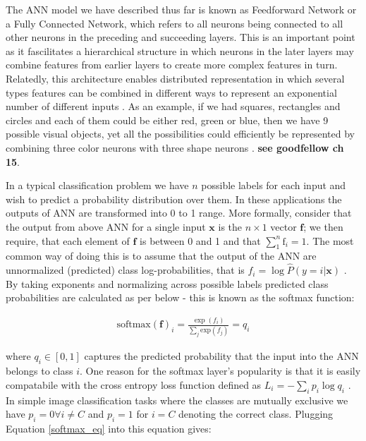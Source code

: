 \documentclass{report}
\begin{document}
The ANN model we have described thus far is known as Feedforward Network or a Fully Connected Network, which refers to all neurons being connected to all other neurons in the preceding and succeeding layers. This is an important point as it fascilitates a hierarchical structure in which neurons in the later layers may combine features from earlier layers to create more complex features in turn. Relatedly, this architecture enables distributed representation in which several types features can be combined in different ways to represent an exponential number of different inputs \cite{Hinton1985}. As an example, if we had squares, rectangles and circles and each of them could be either red, green or blue, then we have 9 possible visual objects, yet all the possibilities could efficiently be represented by combining three color neurons with three shape neurons \cite{Goodfellow2016}. \textbf{see goodfellow ch 15}.

In a typical classification problem we have $n$ possible labels for each input and wish to predict a probability distribution over them. In these applications the outputs of ANN are transformed into 0 to 1 range. More formally, consider that the output from above ANN for a single input $\mathbf{x}$ is the $n \times 1$ vector $\mathbf{f}$; we then require, that each element of $\mathbf{f}$ is between 0 and 1 and that $\sum_1^n \text{f}_i = 1$. The most common way of doing this is to assume that the output of the ANN are unnormalized (predicted) class log-probabilities, that is $f_i = \log \hat{P}(y = i | \mathbf{x})$ \cite{Goodfellow2016}. By taking exponents and normalizing across possible labels predicted class probabilities are calculated as per below - this is known as the softmax function:

\begin{align} \label{softmax_eq}
  \text{softmax}(\mathbf{f})_i = \frac{\exp (f_i)}{\sum_j \text{exp}(f_j)}=q_i
\end{align}

where $q_i \in [0,1]$ captures the predicted probability that the input into the ANN belongs to class $i$. One reason for the softmax layer's popularity is that it is easily compatabile with the cross entropy loss function defined as $L_i=-\sum_i p_i \log q_i$ \cite{Shannon1948}. In simple image classification tasks where the classes are mutually exclusive we have $p_i=0 \forall i\ne C$ and $p_i=1$ for $i=C$ denoting the correct class. Plugging Equation \ref{softmax_eq} into this equation gives:
\end{document}
